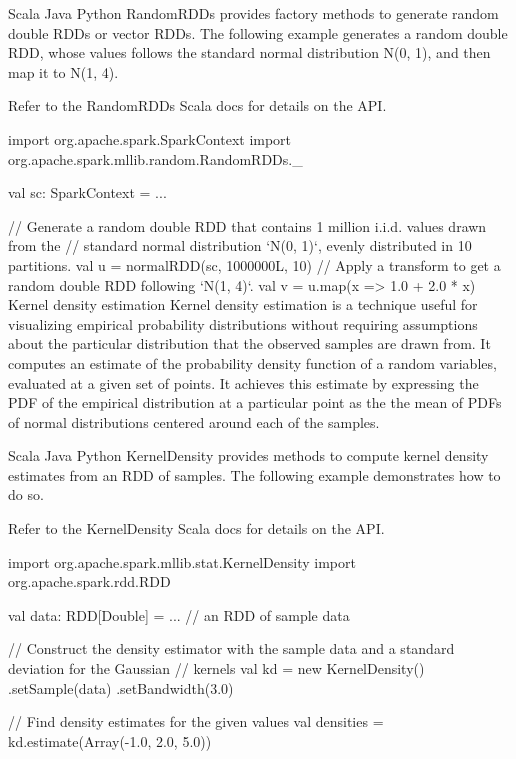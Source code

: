 Scala
Java
Python
RandomRDDs provides factory methods to generate random double RDDs or vector RDDs. The following example generates a random double RDD, whose values follows the standard normal distribution N(0, 1), and then map it to N(1, 4).

Refer to the RandomRDDs Scala docs for details on the API.

import org.apache.spark.SparkContext
import org.apache.spark.mllib.random.RandomRDDs._

val sc: SparkContext = ...

// Generate a random double RDD that contains 1 million i.i.d. values drawn from the
// standard normal distribution `N(0, 1)`, evenly distributed in 10 partitions.
val u = normalRDD(sc, 1000000L, 10)
// Apply a transform to get a random double RDD following `N(1, 4)`.
val v = u.map(x => 1.0 + 2.0 * x)
Kernel density estimation
Kernel density estimation is a technique useful for visualizing empirical probability distributions without requiring assumptions about the particular distribution that the observed samples are drawn from. It computes an estimate of the probability density function of a random variables, evaluated at a given set of points. It achieves this estimate by expressing the PDF of the empirical distribution at a particular point as the the mean of PDFs of normal distributions centered around each of the samples.

Scala
Java
Python
KernelDensity provides methods to compute kernel density estimates from an RDD of samples. The following example demonstrates how to do so.

Refer to the KernelDensity Scala docs for details on the API.

import org.apache.spark.mllib.stat.KernelDensity
import org.apache.spark.rdd.RDD

val data: RDD[Double] = ... // an RDD of sample data

// Construct the density estimator with the sample data and a standard deviation for the Gaussian
// kernels
val kd = new KernelDensity()
  .setSample(data)
  .setBandwidth(3.0)

// Find density estimates for the given values
val densities = kd.estimate(Array(-1.0, 2.0, 5.0))
